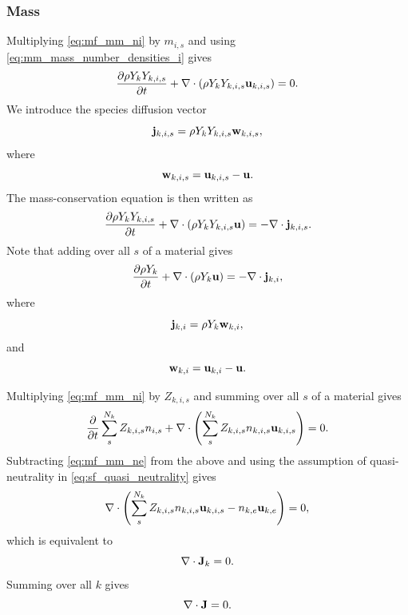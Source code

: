 \documentclass[a4paper,11pt]{report}
\begin{document}
\subsubsection{Mass}

Multiplying \cref{eq:mf_mm_ni} by $m_{i,s}$ and using \cref{eq:mm_mass_number_densities_i} gives
\begin{equation*}
    \frac{\partial \rho Y_k Y_{k,i,s}}{\partial t} + \nabla \cdot \left( \rho Y_k Y_{k,i,s} \mathbf{u}_{k,i,s} \right) = 0.
\end{equation*}
We introduce the species diffusion vector
\begin{equation}
    \label{eq:sf_species_diffusion_vector}
    \mathbf{j}_{k,i,s} = \rho Y_k Y_{k,i,s} \mathbf{w}_{k,i,s},
\end{equation}
where 
\begin{equation}
    \label{eq:sf_species_velocity_shift}
    \mathbf{w}_{k,i,s} = \mathbf{u}_{k,i,s} - \mathbf{u}.
\end{equation}
The mass-conservation equation is then written as
\begin{equation*}
    \frac{\partial \rho Y_k Y_{k,i,s}}{\partial t} + \nabla \cdot \left( \rho Y_k Y_{k,i,s} \mathbf{u} \right) = -\nabla \cdot \mathbf{j}_{k,i,s}.
\end{equation*}
Note that adding over all $s$ of a material gives
\begin{equation*}
    \frac{\partial \rho Y_k }{\partial t} + \nabla \cdot \left( \rho Y_k \mathbf{u} \right) = -\nabla \cdot \mathbf{j}_{k,i},
\end{equation*}
where 
\begin{equation}
    \label{eq:sf_species_diffusion_vector_sum}
    \mathbf{j}_{k,i} = \rho Y_k \mathbf{w}_{k,i},
\end{equation}
and
\begin{equation}
    \label{eq:sf_species_velocity_shift_sum}
    \mathbf{w}_{k,i} = \mathbf{u}_{k,i} - \mathbf{u}.
\end{equation}

Multiplying \cref{eq:mf_mm_ni} by $Z_{k,i,s}$ and summing over all $s$ of a material gives
\begin{equation*}
    \frac{\partial}{\partial t} \sum_s^{N_k} Z_{k,i,s} n_{i,s} + \nabla \cdot \left( \sum_s^{N_k} Z_{k,i,s} n_{k,i,s} \mathbf{u}_{k,i,s} \right) = 0.
\end{equation*}
Subtracting \cref{eq:mf_mm_ne} from the above and using the assumption of quasi-neutrality in \cref{eq:sf_quasi_neutrality} gives
\begin{equation*}
    \nabla \cdot \left( \sum_s^{N_k} Z_{k,i,s} n_{k,i,s} \mathbf{u}_{k,i,s} - n_{k,e} \mathbf{u}_{k,e} \right) = 0,
\end{equation*}
which is equivalent to
\begin{equation*}
    \nabla \cdot \mathbf{J}_k = 0.
\end{equation*}
Summing over all $k$ gives
\begin{equation*}
    \nabla \cdot \mathbf{J} = 0.
\end{equation*}
\end{document}
